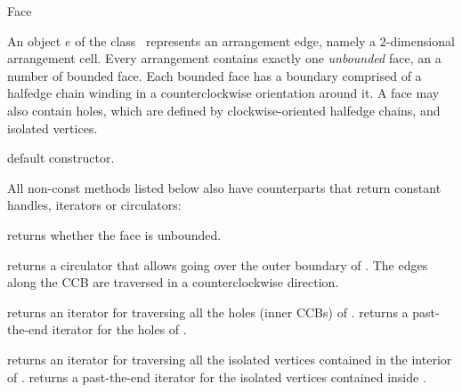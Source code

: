 
\ccRefPageBegin

\begin{ccRefClass}{Face}

\ccDefinition
An object $e$ of the class \ccRefName\ represents an arrangement edge,
namely a $2$-dimensional arrangement cell. Every arrangement contains
exactly one \emph{unbounded} face, an a number of bounded face. Each
bounded face has a boundary comprised of a halfedge chain winding in
a counterclockwise orientation around it. A face may also contain holes,
which are defined by clockwise-oriented halfedge chains, and isolated
vertices.

\ccInheritsFrom

\ccCreation
{}

   {default constructor.}    	    
    
\ccAccessFunctions

All non-const methods listed below also have  counterparts
that return constant handles, iterators or circulators:

    {returns whether the face is unbounded.}    

    {returns a circulator that allows going over the outer boundary of
     \ccVar{}. The edges along the CCB are traversed in a counterclockwise
     direction.
     }
    
    {returns an iterator for traversing all the holes (inner CCBs) of
     \ccVar{}.}
\ccGlue
{}
    {returns a past-the-end iterator for the holes of \ccVar{}.}

    {returns an iterator for traversing all the isolated vertices
     contained in the interior of \ccVar{}.}
\ccGlue
{}
    {returns a past-the-end iterator for the isolated vertices 
     contained inside \ccVar{}.}

\end{ccRefClass}

\ccRefPageEnd